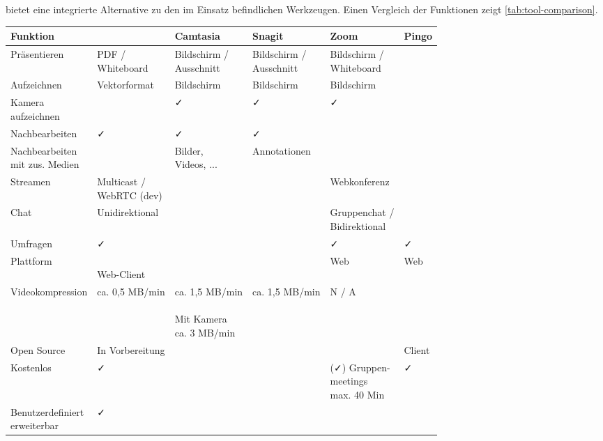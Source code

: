 \vspace{0.5cm}

\lectStudio{} bietet eine integrierte Alternative zu den im Einsatz befindlichen Werkzeugen. Einen Vergleich der Funktionen zeigt \autoref{tab:tool-comparison}.

\vspace{1.0cm}
{
\footnotesize
\begin{tabularx}{\textwidth}{llllll}\toprule
	\textbf{Funktion}	& \textbf{\color{steelblue}\lectStudio}	& \textbf{Camtasia}	& \textbf{Snagit}	& \textbf{Zoom}	&	\textbf{Pingo}	\\ \midrule
	Präsentieren		& \makecell{PDF / \\Whiteboard}		& \makecell{Bildschirm / \\ Ausschnitt}	& \makecell{Bildschirm / \\Ausschnitt}	& \makecell{Bildschirm / \\Whiteboard}	& 	\\ \hline
	Aufzeichnen			& Vektorformat		& Bildschirm	& Bildschirm	& Bildschirm	& 	\\ \hline
	\makecell{Kamera \\aufzeichnen}	& 		& \faCheck{}	& \faCheck{}	& \faCheck{}	& 	\\ \hline
	Nachbearbeiten		& \faCheck{}		& \faCheck{}	& \faCheck{}	& 	& 	\\ \hline
	\makecell{Nachbearbeiten \\mit zus. Medien}	& 	& \makecell{Bilder, \\Videos, ...}	& Annotationen	& 	& 	\\ \hline
	Streamen			& \makecell{Multicast / \\WebRTC (dev)}	& 	& 	& Webkonferenz	& 	\\ \hline
	Chat				& Unidirektional		& 	& 	& \makecell{Gruppenchat / \\Bidirektional}	& 	\\ \hline
	Umfragen			& \faCheck{}		& 	& 	& \faCheck{}	& \faCheck{}	\\ \hline
	Plattform			& \makecell{\faWindows{} \faApple{} \faLinux{} \\Web-Client}	& \faWindows{} \faApple{}	& \faWindows{} \faApple{}	& Web	& Web	\\ \hline
	Videokompression	& ca. 0,5 MB/min		& \makecell{ca. 1,5 MB/min \\ \\ Mit Kamera\\ca. 3 MB/min}	& ca. 1,5 MB/min	& N / A	& 	\\ \hline
	Open Source			& In Vorbereitung	& 	& 	& 	& Client	\\ \hline
	Kostenlos			& \faCheck{}		& 	& 	& \makecell{(\faCheck{}) Gruppen-\\meetings\\max. 40 Min}	& \faCheck{}	\\ \hline
	\makecell{Benutzerdefiniert \\erweiterbar}	& \faCheck{}	& 	& 	& 	& 	\\ \bottomrule
	\hline
\end{tabularx}
}
\label{tab:tool-comparison}



